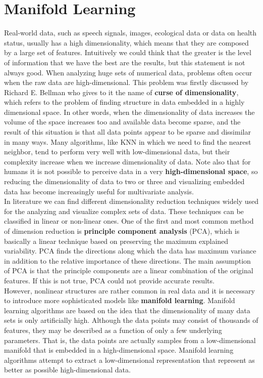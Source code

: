 \documentclass[11pt,a4paper]{article}
\begin{document}
\section{Manifold Learning}
Real-world data, such as speech signals, images, ecological data or data on health status, usually has a high dimensionality, which means that they are composed by a large set of features. Intuitively we could think that the greater is the level of information that we have the best are the results, but this statement is not always good. When analyzing huge sets of numerical data, problems often occur when the raw data are high-dimensional. This problem was firstly discussed by  Richard E. Bellman who gives to it the name of \textbf{curse of dimensionality}, which refers to the problem of finding structure in data embedded in a highly dimensional space. In other words, when the dimensionality of data increases the volume of the space increases too and available data become sparse, and the result of this situation is that all data points appear to be sparse and dissimilar in many ways. Many algorithms, like KNN in which we need to find the nearest neighbor, tend to perform very well with low-dimensional data, but their complexity increase when we increase dimensionality of data. Note also that for humans it is not possible to perceive data in a very \textbf{high-dimensional space}, so reducing the dimensionality of data to two or three and visualizing embedded data has become increasingly useful for multivariate analysis.\\
In literature we can find different dimensionality reduction techniques widely used for the analyzing and visualize complex sets of data. These techniques can be classified in linear or non-linear ones.
One of the first and most common method of dimension reduction is \textbf{principle component analysis} (PCA), which is basically a linear technique based on preserving the maximum explained variability. PCA finds the directions along which the data has maximum variance in addition to the relative importance of these directions. The main assumption of PCA is that the principle components are a linear combination of the original features. If this is not true, PCA could not provide accurate results. \\
However, nonlinear structures are rather common in real data and it is necessary to introduce more sophisticated models like \textbf{manifold learning}. Manifold learning algorithms are based on the idea that the dimensionality of many data sets is only artificially high. Although the data points may consist of thousands of features, they may be described as a function of only a few underlying parameters. That is, the data points are actually samples from a low-dimensional manifold that is embedded in a high-dimensional space. Manifold learning algorithms attempt to extract a low-dimensional representation that represent as better as possible high-dimensional data.\\
\end{document}
